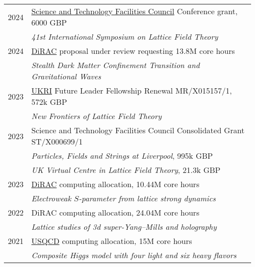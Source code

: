 \documentclass[10 pt]{article}
\newcommand{\blankline}{\quad\pagebreak[2]}
\newcommand{\spacer}{\blankline\vspace{12 pt}\blankline}
\begin{document}
\vspace{-12 pt} %
\begin{tabular}[t]{cl}
  2024 & \href{https://stfc.ukri.org}{Science and Technology Facilities Council} Conference grant, 6000 GBP \\
       & \textit{41st International Symposium on Lattice Field Theory}                                      \\[6 pt]
  2024 & \href{https://dirac.ac.uk}{DiRAC} proposal under review requesting 13.8M core hours                \\ %
       & \textit{Stealth Dark Matter Confinement Transition and Gravitational Waves}                        \\[6 pt]
  2023 & \href{https://www.ukri.org}{UKRI} Future Leader Fellowship Renewal {MR/X015157/1}, 572k GBP        \\
       & \textit{New Frontiers of Lattice Field Theory}                                                     \\[6 pt]
  2023 & Science and Technology Facilities Council Consolidated Grant {ST/X000699/1}                        \\
       & \textit{Particles, Fields and Strings at Liverpool}, 995k GBP                                      \\
       & \textit{UK Virtual Centre in Lattice Field Theory}, 21.3k GBP                                      \\[6 pt]
  2023 & \href{https://dirac.ac.uk}{DiRAC} computing allocation, 10.44M core hours                          \\ %
       & \textit{Electroweak $S$-parameter from lattice strong dynamics}                                    \\[6 pt]
  2022 & DiRAC computing allocation, 24.04M core hours                                                      \\ %
       & \textit{Lattice studies of 3d super-Yang--Mills and holography}                                    \\[6 pt]
  2021 & \href{http://www.usqcd.org}{USQCD} computing allocation, 15M core hours                            \\ %
       & \textit{Composite Higgs model with four light and six heavy flavors}                               \\[6 pt]
\end{tabular}

\spacer
\end{document}
